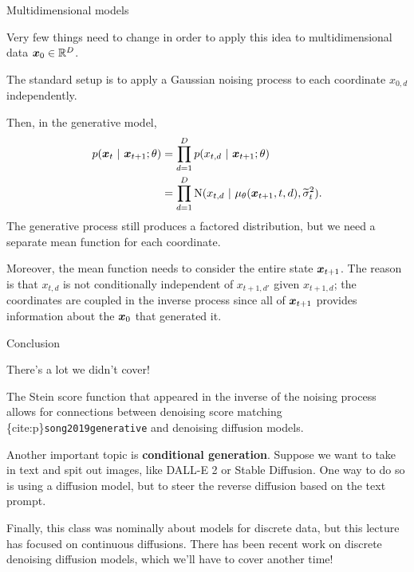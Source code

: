 \documentclass[aspectratio=169]{beamer}
\begin{document}
\begin{frame}[t,allowframebreaks]{Multidimensional models}\label{multidimensional-models}

Very few things need to change in order to apply this idea to
multidimensional data \(\boldsymbol{x}_0 \in \mathbb{R}^D\). 

The standard setup is to
apply a Gaussian noising process to each coordinate \(x_{0,d}\)
independently. 

Then, in the generative model, \begin{align*}
p(\boldsymbol{x}_t ~\vert~ \boldsymbol{x}_{t+1}; \theta)
&= \prod_{d=1}^D p(x_{t,d} ~\vert~ \boldsymbol{x}_{t+1}; \theta) \\
&= \prod_{d=1}^D \mathrm{N}(x_{t,d} ~\vert~ \mu_\theta(\boldsymbol{x}_{t+1}, t, d), \widetilde{\sigma}_t^2). 
\end{align*} 
The generative process still produces a factored
distribution, but we need a separate mean function for each coordinate.

Moreover, the mean function needs to consider the entire state
\(\boldsymbol{x}_{t+1}\). The reason is that \(x_{t,d}\) is not conditionally
independent of \(x_{t+1,d'}\) given \(x_{t+1,d}\); the coordinates are
coupled in the inverse process since all of \(\boldsymbol{x}_{t+1}\) provides
information about the \(\boldsymbol{x}_0\) that generated it.
\end{frame}

\begin{frame}[t,allowframebreaks]{Conclusion}\label{conclusion}

There's a lot we didn't cover! 

The Stein score function that appeared in
the inverse of the noising process allows for connections between
denoising score matching \{cite:p\}\texttt{song2019generative} and
denoising diffusion models.

Another important topic is \textbf{conditional generation}. Suppose we
want to take in text and spit out images, like DALL-E 2 or Stable
Diffusion. One way to do so is using a diffusion model, but to steer the
reverse diffusion based on the text prompt. 

Finally, this class was nominally about models for discrete data, but
this lecture has focused on continuous diffusions. There has been recent
work on discrete denoising diffusion models, which we'll have to cover
another time!

\end{frame}
    
    
\end{document}
